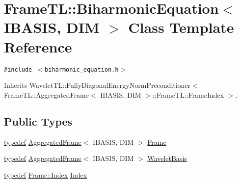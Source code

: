 \hypertarget{classFrameTL_1_1BiharmonicEquation}{
\section{FrameTL::BiharmonicEquation$<$ IBASIS, DIM $>$ Class Template Reference}
\label{classFrameTL_1_1BiharmonicEquation}
}
{\tt \#include $<$biharmonic\_\-equation.h$>$}

Inherits WaveletTL::FullyDiagonalEnergyNormPreconditioner$<$ FrameTL::AggregatedFrame$<$ IBASIS, DIM $>$::FrameTL::FrameIndex $>$.

\subsection*{Public Types}
\begin{CompactItemize}
\item 
\hyperlink{structtypedef}{typedef} \hyperlink{classFrameTL_1_1AggregatedFrame}{AggregatedFrame}$<$ IBASIS, DIM $>$ \hyperlink{classFrameTL_1_1BiharmonicEquation_a6589dcf7cfc46ba411c3f35146e1a5d}{Frame}
\item 
\hyperlink{structtypedef}{typedef} \hyperlink{classFrameTL_1_1AggregatedFrame}{AggregatedFrame}$<$ IBASIS, DIM $>$ \hyperlink{classFrameTL_1_1BiharmonicEquation_2c96ea759f7da9b09717e9a68eb49a6f}{WaveletBasis}
\item 
\hyperlink{structtypedef}{typedef} \hyperlink{classFrameTL_1_1FrameIndex}{Frame::Index} \hyperlink{classFrameTL_1_1BiharmonicEquation_3092eb11291bea911cf17d1de560bc1e}{Index}
\end{CompactItemize}
